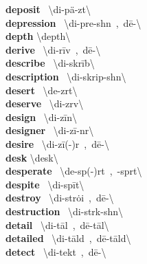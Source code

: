\documentclass[10pt,a4paper]{article}
\begin{document}
\begin{multicols}{2}
\textbf{ deposit }\quad \ \textbackslash di-\textprimstress p\"{a}-z\textschwa t\textbackslash \\
\textbf{ depression }\quad \ \textbackslash di-\textprimstress pre-sh\textschwa n\ ,\ d\={e}-\textbackslash \\
\textbf{ depth }\quad \textbackslash \textprimstress depth\textbackslash \\
\textbf{ derive }\quad \ \textbackslash di-\textprimstress r\={i}v\ ,\ d\={e}-\textbackslash \\
\textbf{ describe }\quad \ \textbackslash di-\textprimstress skr\={i}b\textbackslash \\
\textbf{ description }\quad \ \textbackslash di-\textprimstress skrip-sh\textschwa n\textbackslash \\
\textbf{ desert }\quad \ \textbackslash \textprimstress de-z\textschwa rt\textbackslash \\
\textbf{ deserve }\quad \ \textbackslash di-\textprimstress z\textschwa rv\textbackslash \\
\textbf{ design }\quad \ \textbackslash di-\textprimstress z\={i}n\textbackslash \\
\textbf{ designer }\quad \ \textbackslash di-\textprimstress z\={i}-n\textschwa r\textbackslash \\
\textbf{ desire }\quad \ \textbackslash di-\textprimstress z\={i}(-\textschwa )r\ ,\ d\={e}-\textbackslash \\
\textbf{ desk }\quad \textbackslash \textprimstress desk\textbackslash \\
\textbf{ desperate }\quad \ \textbackslash \textprimstress de-sp(\textschwa -)r\textschwa t\ ,\ -sp\textschwa rt\textbackslash \\
\textbf{ despite }\quad \ \textbackslash di-\textprimstress sp\={i}t\textbackslash \\
\textbf{ destroy }\quad \ \textbackslash di-\textprimstress str\.{o}i\ ,\ d\={e}-\textbackslash \\
\textbf{ destruction }\quad \ \textbackslash di-\textprimstress str\textschwa k-sh\textschwa n\textbackslash \\
\textbf{ detail }\quad \ \textbackslash di-\textprimstress t\={a}l\ ,\ \textprimstress d\={e}-\textsecstress t\={a}l\textbackslash \\
\textbf{ detailed }\quad \ \textbackslash di-\textprimstress t\={a}ld\ ,\ \textprimstress d\={e}-\textsecstress t\={a}ld\textbackslash \\
\textbf{ detect }\quad \ \textbackslash di-\textprimstress tekt\ ,\ d\={e}-\textbackslash \\

\end{multicols}
\end{document}

